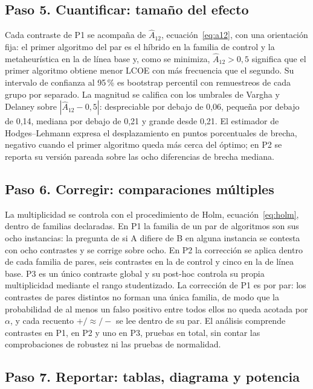 \subsection{Paso 5. Cuantificar: tamaño del efecto}

Cada contraste de P1 se acompaña de $\hat{A}_{12}$, ecuación~\eqref{eq:a12}, con una orientación fija: el primer algoritmo del par es el híbrido en la familia de control y la metaheurística en la de línea base y, como se minimiza, $\hat{A}_{12}>0{,}5$ significa que el primer algoritmo obtiene menor LCOE con más frecuencia que el segundo. Su intervalo de confianza al 95\,\% es bootstrap percentil con \StatBootstrap{} remuestreos de cada grupo por separado. La magnitud se califica con los umbrales de Vargha y Delaney sobre $|\hat{A}_{12}-0{,}5|$: despreciable por debajo de 0,06, pequeña por debajo de 0,14, mediana por debajo de 0,21 y grande desde 0,21. El estimador de Hodges--Lehmann expresa el desplazamiento en puntos porcentuales de brecha, negativo cuando el primer algoritmo queda más cerca del óptimo; en P2 se reporta su versión pareada sobre las ocho diferencias de brecha mediana.

\subsection{Paso 6. Corregir: comparaciones múltiples}

La multiplicidad se controla con el procedimiento de Holm, ecuación~\eqref{eq:holm}, dentro de familias declaradas. En P1 la familia de un par de algoritmos son sus ocho instancias: la pregunta de si A difiere de B en alguna instancia se contesta con ocho contrastes y se corrige sobre ocho. En P2 la corrección se aplica dentro de cada familia de pares, seis contrastes en la de control y cinco en la de línea base. P3 es un único contraste global y su post-hoc controla su propia multiplicidad mediante el rango studentizado. La corrección de P1 es por par: los contrastes de pares distintos no forman una única familia, de modo que la probabilidad de al menos un falso positivo entre todos ellos no queda acotada por $\alpha$, y cada recuento $+/\approx/-$ se lee dentro de su par. El análisis comprende \StatTestsPerInstance{} contrastes en P1, \StatTestsGlobal{} en P2 y uno en P3, \StatTestsTotal{} pruebas en total, sin contar las comprobaciones de robustez ni las pruebas de normalidad.

\subsection{Paso 7. Reportar: tablas, diagrama y potencia}

